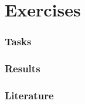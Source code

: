 \documentclass[9pt,xcolor=table]{beamer}
\begin{document}
\part{Exercises}
\section{Tasks}
\section{Results}

\section{Literature}
\begin{frame}[c]
\frametitle{\insertsection{}}
\nocite{*}
\tiny%


\end{frame}
\end{document}
